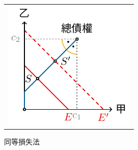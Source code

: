 \begin{center}
	\hfill
	\begin{tabular}{l}
		\includegraphics{divide/divide-equal_losses.pdf}
	\end{tabular}
	\hfill\textsf{同等損失法}
\end{center}
